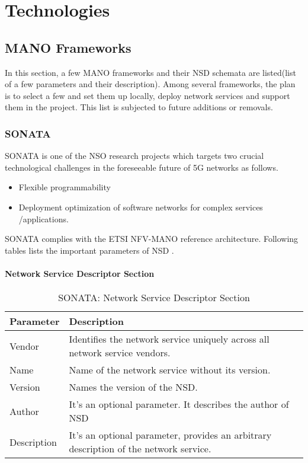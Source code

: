 \chapter{Technologies}
\label{ch:Technologies}
\section{MANO Frameworks}
\label{manoframeworks}
In this section, a few MANO frameworks and their NSD schemata are listed(list of a few parameters and their description). Among several frameworks, the plan is to select a few and set them up locally, deploy network services and support them in the project. This list is subjected to future additions or removals.

\subsection{SONATA}
\label{SecSONATA}
SONATA is one of the NSO research projects which targets two crucial technological challenges in the foreseeable future of 5G networks as follows\cite{SONATA}.
\begin{itemize}
    \item Flexible programmability
    \item Deployment optimization of software networks for complex services /applications.
\end{itemize}
SONATA complies with the ETSI NFV-MANO reference architecture. Following tables lists the important parameters of NSD \cite{SONATASchemaDocumentation}.
\subsubsection{Network Service Descriptor Section}
    \begin{table}[h]
    \centering
    \begin{tabular}{ |p{4cm}|p{10cm}|}
        \hline
        \textbf{Parameter} & \textbf{Description} \\
        \hline
         
         Vendor & Identifies the network service uniquely across all network service vendors. \\
         \hline
         Name & Name of the network service without its version. \\
         \hline
         Version & Names the version of the NSD. \\
         \hline
         Author & It's an optional parameter. It describes the author of NSD \\
         \hline
         Description & It's an optional parameter, provides an arbitrary description of the network service. \\
         \hline
    \end{tabular}
    \caption{SONATA: Network Service Descriptor Section}
    \label{tab:SONATA_general_section}
\end{table}

